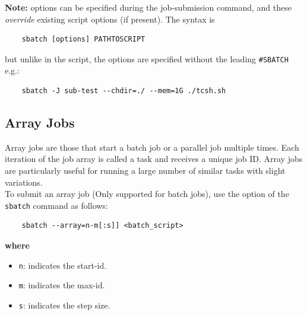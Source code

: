 \noindent \textbf{Note:}  options can be specified during the job-submission 
command, and these \emph{override} existing script options (if present). The 
syntax is
\begin{verbatim}
	sbatch [options] PATHTOSCRIPT
\end{verbatim}
but unlike in the script, the options are specified without the leading \verb+#SBATCH+
e.g.: 
\begin{verbatim}
	sbatch -J sub-test --chdir=./ --mem=1G ./tcsh.sh
\end{verbatim}

\subsection{Array Jobs}
\label{sect:array-jobs}

Array jobs are those that start a batch job or a parallel job multiple times. 
Each iteration of the job array is called a task and receives a unique job ID.
Array jobs are particularly useful for running a large number of similar tasks with slight variations.\\

\noindent To submit an array job (Only supported for batch jobs), use the  option of the \texttt{sbatch} 
command as follows:

\begin{verbatim}
	sbatch --array=n-m[:s]] <batch_script>
\end{verbatim}

\noindent \textbf{where}
\begin{itemize}
	\item
	\texttt{n}: indicates the start-id.
	\item
	\texttt{m}: indicates the max-id.
	\item
	\texttt{s}: indicates the step size.
\end{itemize}

